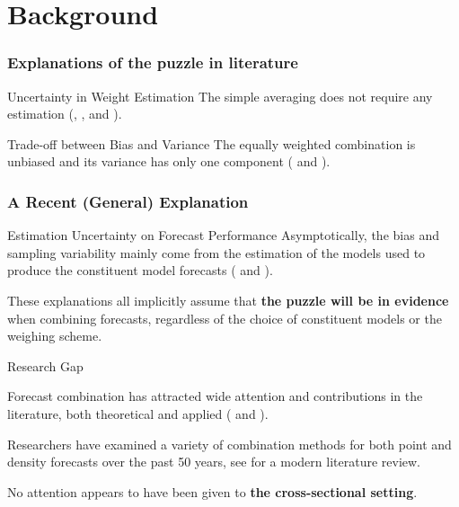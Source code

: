 
\section{Background}


\begin{frame}
    \frametitle{Explanations of the puzzle in literature}

        \begin{exampleblock}{\large{Uncertainty in Weight Estimation}}
        The simple averaging does not require any estimation (\cite{SW98}, \cite{SW04}, and \cite{SW09}).
        \end{exampleblock}

        \vspace{4mm}

        \begin{exampleblock}{\large{Trade-off between Bias and Variance}}
        The equally weighted combination is unbiased and its variance has only one component (\cite{E11} and \cite{CMVW16}).
        \end{exampleblock}

\end{frame}




\begin{frame}
\frametitle{A Recent (General) Explanation}

    \begin{exampleblock}{\large{Estimation Uncertainty on Forecast Performance}}
    Asymptotically, the bias and sampling variability mainly come from the estimation of the models used to produce the constituent model forecasts (\cite{ZMFP22} and \cite{FZMP23}).
    \end{exampleblock}

    \vspace{4mm}
    
    These explanations all implicitly assume that \textbf{the puzzle will be in evidence} when combining forecasts, regardless of the choice of constituent models or the weighing scheme. 


\end{frame}


\begin{frame}{Research Gap}
    
    Forecast combination has attracted wide attention and contributions in the literature, both theoretical and applied (\cite{C89} and \cite{T06}).

    \vspace{4mm}
    
    Researchers have examined a variety of combination methods for both point and density forecasts over the past 50 years, see \cite{WHLK22} for a modern literature review.

    \vspace{4mm}
    
    No attention appears to have been given to \textbf{the cross-sectional setting}. 
    
\end{frame}


